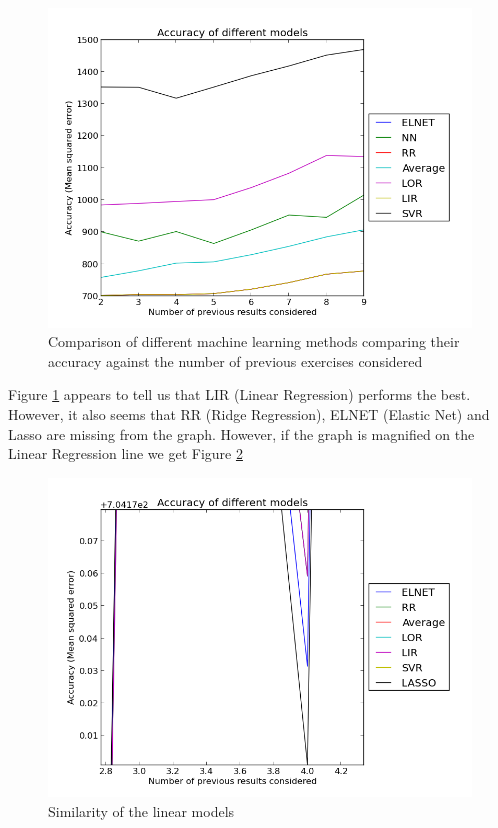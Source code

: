 \begin{figure}[p]
\centering
\includegraphics[width=1\textwidth]{images/kfoldall.png}
\caption{Comparison of different machine learning methods comparing their accuracy against the number of previous exercises considered}
\label{fig:kfoldall}
\end{figure}

Figure \ref{fig:kfoldall} appears to tell us that LIR (Linear Regression) performs the best. However, it also seems that RR (Ridge Regression), ELNET (Elastic Net) and Lasso are missing from the graph. However, if the graph is magnified on the Linear Regression line we get Figure \ref{fig:zoomed}

\begin{figure}[p]
\centering
\includegraphics[width=1\textwidth]{images/linearmodels.png}
\caption{Similarity of the linear models}
\label{fig:zoomed}
\end{figure}

